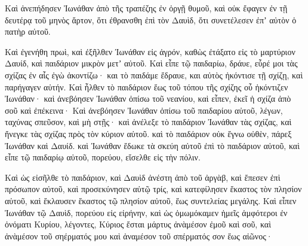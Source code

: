 {Καὶ ἀνεπήδησεν Ἰωνάθαν ἀπὸ τῆς τραπέζης ἐν ὀργῇ θυμοῦ, καὶ οὐκ ἔφαγεν ἐν τῇ δευτέρᾳ τοῦ μηνὸς ἄρτον, ὅτι ἐθρανσθη ἐπὶ τὸν Δαυὶδ, ὅτι συνετέλεσεν ἐπʼ αὐτὸν ὁ πατὴρ αὐτοῦ.
\par }{\PP {}Καὶ ἐγενήθη πρωὶ, καὶ ἐξῆλθεν Ἰωνάθαν εἰς ἀγρόν, καθὼς ἐτάξατο εἰς τὸ μαρτύριον Δαυίδ, καὶ παιδάριον μικρὸν μετʼ αὐτοῦ.
Καὶ εἶπε τῷ παιδαρίω, δράυε, εὗρέ μοι τὰς σχίζας ἐν αἷς ἐγὼ ἀκοντίζω· και τὸ παιδάμε ἔδραυε, και αὐτὸς ἠκόντισε τῇ σχίζῃ, καὶ παρήγαγεν αὐτήν.
Καὶ ἦλθεν τὸ παιδάριον ἕως τοῦ τόπου τῆς σχίζης οὗ ἠκόντιζεν Ἰωνάθαν· καὶ ἀνεβόησεν Ἰωνάθαν ὀπίσω τοῦ νεανίου, καὶ εἶπεν, ἐκεῖ ἡ σχίζα ἀπὸ σοῦ καὶ ἐπέκεινα·
Καὶ ἀνεβόησεν Ἰωνάθαν ὀπίσω τοῦ παιδαρίου αὐτοῦ, λέγων, ταχύνας σπεῦσον, καὶ μὴ στῇς· καὶ ἀνέλεξε τὸ παιδάριον Ἰωνάθαν τὰς σχίζας, καὶ ἤνεγκε τὰς σχίζας πρὸς τὸν κύριον αὐτοῦ.
καὶ τὸ παιδάριον οὐκ ἔγνω οὐθὲν, πάρεξ Ἰωνάθαν καὶ Δαυίδ.
καὶ Ἰωνάθαν ἔδωκε τὰ σκεύη αὐτοῦ ἐπὶ τὸ παιδάριον αὐτοῦ, καὶ εἶπε τῷ παιδαρίῳ αὐτοῦ, πορεύου, εἴσελθε εἰς τὴν πόλιν.
\par }{\PP {}Καὶ ὡς εἰσῆλθε τὸ παιδάριον, καὶ Δαυὶδ ἀνέστη ἀπὸ τοῦ ἀργὰβ, καὶ ἔπεσεν ἐπὶ πρόσωπον αὐτοῦ, καὶ προσεκύνησεν αὐτῷ τρίς, καὶ κατεφίλησεν ἕκαστος τὸν πλησίον αὐτοῦ, καὶ ἔκλαυσεν ἕκαστος τῷ πλησίον αὐτοῦ, ἕως συντελείας μεγάλης.
Καὶ εἶπεν Ἰωνάθαν τῷ Δαυὶδ, πορεύου εἰς εἰρήνην, καὶ ὡς ὀμωμόκαμεν ἡμεῖς ἀμφότεροι ἐν ὀνόματι Κυρίου, λέγοντες, Κύριος ἔσται μάρτυς ἀνὰμέσον ἐμοῦ καὶ σοῦ, καὶ ἀνὰμέσον τοῦ σηέρματός μου καὶ ἀναμέσον τοῦ σπέρματός σον ἕως αἰῶνος·

}
